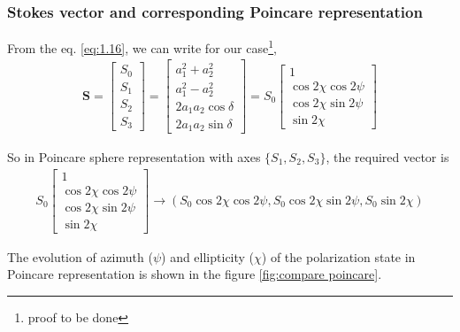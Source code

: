 \documentclass[11pt,a4paper]{article}
\numberwithin{equation}{section}
\begin{document}
\subsubsection{Stokes vector and corresponding Poincare representation}
From the eq. \ref{eq:1.16}, we can write for our case\footnote{proof to be done}, 
\begin{align}
	\boldsymbol{S}= \begin{bmatrix} S_0\\ S_1\\ S_2\\S_3\end{bmatrix} =
	\begin{bmatrix}
		{a_1^2 + a_2^2}\\
		{a_1^2 - a_2^2}\\
		{2a_1a_2\cos\delta}\\
		{2a_1a_2\sin\delta}
	\end{bmatrix}=S_0
	\begin{bmatrix}
		1\\
		\cos 2\chi \cos 2\psi\\
		\cos 2\chi \sin 2\psi\\
		\sin 2\chi
	\end{bmatrix}
\end{align}

So in Poincare sphere representation with axes $\{S_1, S_2, S_3\}$, the required vector is
\begin{align}
	S_0
	\begin{bmatrix}
		1\\
		\cos 2\chi \cos 2\psi\\
		\cos 2\chi \sin 2\psi\\
		\sin 2\chi
	\end{bmatrix}\longrightarrow
	(S_0\cos 2\chi \cos 2\psi, S_0\cos 2\chi \sin 2\psi, S_0\sin 2\chi)
\end{align}

The evolution of azimuth ($\psi$) and ellipticity ($\chi$) of the polarization state in Poincare representation is shown in the figure \ref{fig:compare poincare}.
\end{document}

